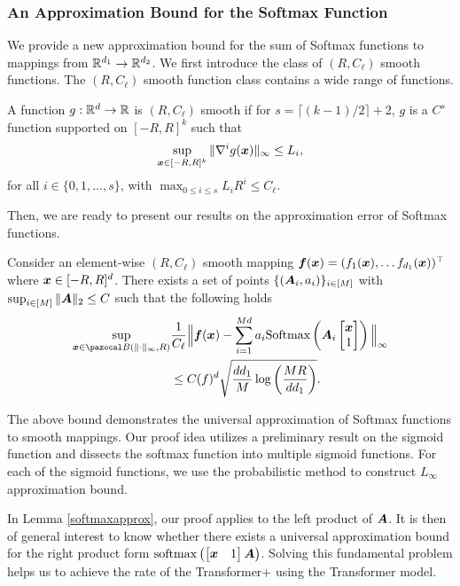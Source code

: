 \subsubsection{An Approximation Bound for the Softmax Function} We provide a new approximation bound for the sum of Softmax functions to mappings from $\mathbb{R}^{d_1}\to\mathbb{R}^{d_2}$. We first introduce the class of $(R,C_{\ell})$ smooth functions. The $(R, C_{\ell})$ smooth function class contains a wide range of functions.
\begin{definition}\label{rcsmoothfunc}
    A function $g:\mathbb{R}^d\to\mathbb{R}$ is $(R, C_{\ell})$ smooth if for $s= \lceil(k-1)/2\rceil+2$, $g$ is a $C^s$ function supported on $[-R, R]^k$ such that
    \begin{align*}
        \sup_{\boldsymbol{x}\in [-R,R]^k}\Vert\nabla^ig(\boldsymbol{x})\Vert_{\infty}\leq L_i,
    \end{align*}
    for all $i\in\{0,1,\ldots,s\}$, with $\max_{0\leq i\leq s}L_iR^i\leq C_{\ell}$.
\end{definition}
Then, we are ready to present our results on the approximation error of Softmax functions.
 \begin{lemma}\label{softmaxapprox}
        Consider an element-wise $(R, C_{\ell})$ smooth mapping $\boldsymbol{f}(\boldsymbol{x})=(f_1(\boldsymbol{x}),\ldots f_{d_1}(\boldsymbol{x}))^\top$ where $\boldsymbol{x}\in[-R,R]^d$. There exists a set of points $\{(\boldsymbol{A}_{i}, a_{i})\}_{i\in[M]}$ with $\sup_{i\in[M]}\Vert\boldsymbol{A}\Vert_2\leq C$ such that the following holds
        \begin{align*}
            \sup_{\bfa x\in\ca B\lef(\Vert\cdot\Vert_\infty, R\rig)}&\frac{1}{C_{\ell}}\Big\Vert\bfa f(\bfa x)-\sum_{i=1}^{Md} a_i\softmaxx\lef(\bfa A_i\begin{bmatrix}
                \bfa x\\
            1\end{bmatrix}\rig)\Big\Vert_{\infty}\\
            &\leq C(f)^d\sqrt{\frac{dd_1}{M}\log\lef(\frac{MR}{dd_1}\rig)}.
        \end{align*}
 \end{lemma}
\begin{remark}
    The above bound demonstrates the universal approximation of Softmax functions to smooth mappings. Our proof idea utilizes a preliminary result on the sigmoid function and dissects the softmax function into multiple sigmoid functions. For each of the sigmoid functions, we use the probabilistic method to construct $L_{\infty}$ approximation bound.
\end{remark}
In Lemma \ref{softmaxapprox}, our proof applies to the left product of $\boldsymbol{A}$. It is then of general interest to know whether there exists a universal approximation bound for the right product form $\mathrm{softmax}\left(\begin{bmatrix}
        \boldsymbol{x}&1
\end{bmatrix}\boldsymbol{A}\right)$. Solving this fundamental problem helps us to achieve the rate of the Transformer+ using the Transformer model.
